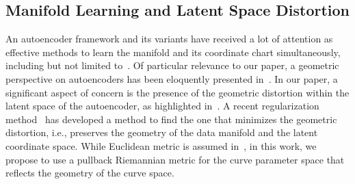 \subsection{Manifold Learning and Latent Space Distortion} 
An autoencoder framework and its variants have received a lot of attention as effective methods to learn the manifold and its coordinate chart simultaneously, including but not limited to~\cite{lee2021neighborhood, kingma2013auto, creswell2017adversarial, rifai2011contractive, yonghyeon2022regularized, lee2023explicit, nazari2023geometric, yoon2021autoencoding,janggeometrically,lee2022statistical}. Of particular relevance to our paper, a geometric perspective on autoencoders has been eloquently presented in~\cite{lee2023geometric}.  
In our paper, a significant aspect of concern is the presence of the geometric distortion within the latent space of the autoencoder, as highlighted in~\cite{shao2018riemannian, arvanitidis2017latent, yonghyeon2022regularized, lee2023geometric, nazari2023geometric}. 
A recent regularization method~\cite{yonghyeon2022regularized} has developed a method to find the one that minimizes the geometric distortion, i.e., preserves the geometry of the data manifold and the latent coordinate space.
While Euclidean metric is assumed in~\cite{yonghyeon2022regularized}, in this work, we propose to use a pullback Riemannian metric for the curve parameter space that reflects the geometry of the curve space. 

